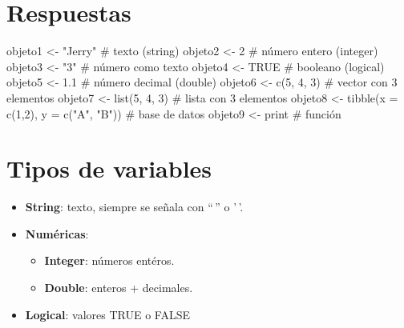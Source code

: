\documentclass[
  letterpaper,
  DIV=11,
  numbers=noendperiod]{scrreprt}
\newenvironment{Shaded}{\begin{snugshade}}{\end{snugshade}}
\newcommand{\AttributeTok}[1]{\textcolor[rgb]{0.40,0.45,0.13}{#1}}
\newcommand{\CommentTok}[1]{\textcolor[rgb]{0.37,0.37,0.37}{#1}}
\newcommand{\ConstantTok}[1]{\textcolor[rgb]{0.56,0.35,0.01}{#1}}
\newcommand{\DecValTok}[1]{\textcolor[rgb]{0.68,0.00,0.00}{#1}}
\newcommand{\FloatTok}[1]{\textcolor[rgb]{0.68,0.00,0.00}{#1}}
\newcommand{\FunctionTok}[1]{\textcolor[rgb]{0.28,0.35,0.67}{#1}}
\newcommand{\NormalTok}[1]{\textcolor[rgb]{0.00,0.23,0.31}{#1}}
\newcommand{\OtherTok}[1]{\textcolor[rgb]{0.00,0.23,0.31}{#1}}
\newcommand{\StringTok}[1]{\textcolor[rgb]{0.13,0.47,0.30}{#1}}
\begin{document}
\section{Respuestas}

\begin{Shaded}
\begin{Highlighting}[]
\NormalTok{objeto1 }\OtherTok{\textless{}{-}} \StringTok{"Jerry"}                              \CommentTok{\# texto (string)}
\NormalTok{objeto2 }\OtherTok{\textless{}{-}} \DecValTok{2}                                    \CommentTok{\# número entero (integer)}
\NormalTok{objeto3 }\OtherTok{\textless{}{-}} \StringTok{"3"}                                  \CommentTok{\# número como texto}
\NormalTok{objeto4 }\OtherTok{\textless{}{-}} \ConstantTok{TRUE}                                 \CommentTok{\# booleano (logical)}
\NormalTok{objeto5 }\OtherTok{\textless{}{-}} \FloatTok{1.1}                                  \CommentTok{\# número decimal (double)}
\NormalTok{objeto6 }\OtherTok{\textless{}{-}} \FunctionTok{c}\NormalTok{(}\DecValTok{5}\NormalTok{, }\DecValTok{4}\NormalTok{, }\DecValTok{3}\NormalTok{)                           }\CommentTok{\# vector con 3 elementos}
\NormalTok{objeto7 }\OtherTok{\textless{}{-}} \FunctionTok{list}\NormalTok{(}\DecValTok{5}\NormalTok{, }\DecValTok{4}\NormalTok{, }\DecValTok{3}\NormalTok{)                        }\CommentTok{\# lista con 3 elementos}
\NormalTok{objeto8 }\OtherTok{\textless{}{-}} \FunctionTok{tibble}\NormalTok{(}\AttributeTok{x =} \FunctionTok{c}\NormalTok{(}\DecValTok{1}\NormalTok{,}\DecValTok{2}\NormalTok{), }\AttributeTok{y =} \FunctionTok{c}\NormalTok{(}\StringTok{"A"}\NormalTok{, }\StringTok{"B"}\NormalTok{))  }\CommentTok{\# base de datos}
\NormalTok{objeto9 }\OtherTok{\textless{}{-}}\NormalTok{ print                                }\CommentTok{\# función}
\end{Highlighting}
\end{Shaded}

\section{Tipos de variables}\label{tipos-de-variables}

\begin{itemize}
\item
  \textbf{String}: texto, siempre se señala con ``\,'' o '\,'.
\item
  \textbf{Numéricas}:

  \begin{itemize}
  \item
    \textbf{Integer}: números entéros.
  \item
    \textbf{Double}: enteros + decimales.
  \end{itemize}
\item
  \textbf{Logical}: valores TRUE o FALSE
\end{itemize}
\end{document}
